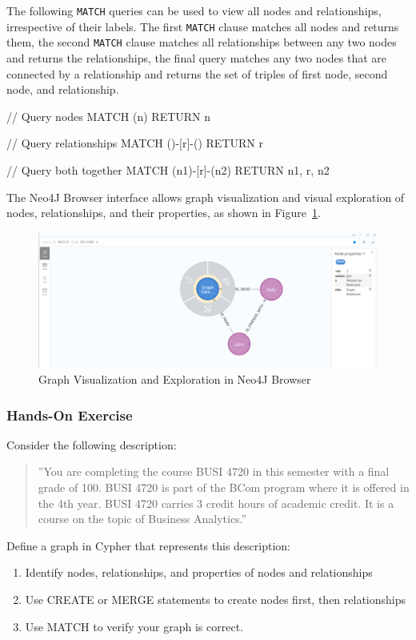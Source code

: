 The following \texttt{MATCH} queries can be used to view all nodes and relationships, irrespective of their labels. The first \texttt{MATCH} clause matches all nodes and returns them, the second \texttt{MATCH} clause matches all relationships between any two nodes and returns the relationships, the final query matches any two nodes that are connected by a relationship and returns the set of triples of first node, second node, and relationship.

\begin{samepage}
\begin{cyphercode}
// Query nodes
MATCH (n) RETURN n    
                
// Query relationships
MATCH ()-[r]-() RETURN r              

// Query both together
MATCH (n1)-[r]-(n2) RETURN n1, r, n2  
\end{cyphercode}
\end{samepage}

\noindent The Neo4J Browser interface allows graph visualization and visual exploration of nodes, relationships, and their properties, as shown in Figure~\ref{fig:neo4jgraphviz}.

\begin{figure}[h]
\centering
\includegraphics[width=.8\textwidth]{screen2.png}
\caption{Graph Visualization and Exploration in Neo4J Browser}
\label{fig:neo4jgraphviz}
\end{figure}

\begin{tcolorbox}[colback=code]
\subsubsection*{Hands-On Exercise}

Consider the following description:

\begin{quote}
''You are completing the course BUSI 4720 in this semester with a final grade of 100. BUSI 4720 is part of the BCom program where it is offered in the 4th year. BUSI 4720 carries 3 credit hours of academic credit. It is a course on the topic of Business Analytics.''
\end{quote}

Define a graph in Cypher that represents this description:
\begin{enumerate}
  \item Identify nodes, relationships, and properties of nodes and relationships
  \item Use CREATE or MERGE statements to create nodes first, then relationships
  \item Use MATCH to verify your graph is correct.
\end{enumerate}
\end{tcolorbox}


